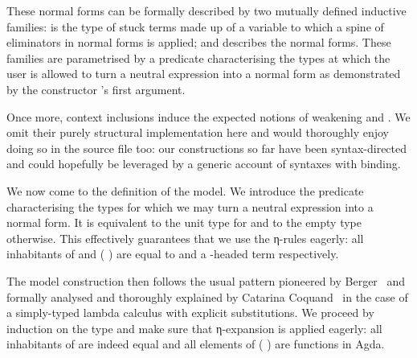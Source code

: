 These normal forms can be formally described by two mutually defined
inductive families:  is the type of stuck terms made
up of a variable to which a spine of eliminators in normal forms is
applied; and  describes the normal forms. These
families are parametrised by a predicate  characterising the
types at which the user is allowed to turn a neutral expression into a
normal form as demonstrated by the constructor 's first argument.


Once more, context inclusions induce the expected notions of weakening 
and . We omit their purely structural implementation here and would
thoroughly enjoy doing so in the source file too: our constructions so far have
been syntax-directed and could hopefully be leveraged by a generic account of syntaxes
with binding.

We now come to the definition of the model. We introduce the predicate
 characterising the types for which we may turn a neutral
expression into a normal form. It is equivalent to the unit type 
for  and to the empty type  otherwise. This effectively
guarantees that we use the η-rules eagerly: all inhabitants of
 \AF{⊢[}  \AF{]^{nf}}  and
 \AF{⊢[}  \AF{]^{nf}} (  ) are
equal to  and a -headed term respectively.

The model construction then follows the usual pattern pioneered by
Berger~\cite{berger1993program} and formally analysed and thoroughly
explained by Catarina Coquand~\cite{coquand2002formalised} in the case
of a simply-typed lambda calculus with explicit substitutions. We proceed by
induction on the type and make sure that η-expansion is applied eagerly: all
inhabitants of    are indeed equal and all elements
of   (  ) are functions in Agda.

\begin{minipage}[t]{0.3\textwidth}
\end{minipage}
\begin{minipage}[t]{0.7\textwidth}
\end{minipage}


